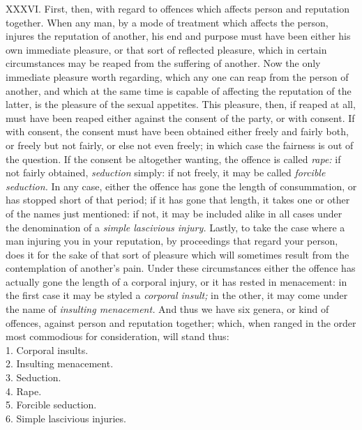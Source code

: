 \documentclass[12pt]{report}
\begin{document}
XXXVI. First, then, with regard to offences which affects person and
reputation together. When any man, by a mode of treatment which affects
the person, injures the reputation of another, his end and purpose must
have been either his own immediate pleasure, or that sort of reflected
pleasure, which in certain circumstances may be reaped from the
suffering of another. Now the only immediate pleasure worth regarding,
which any one can reap from the person of another, and which at the same
time is capable of affecting the reputation of the latter, is the
pleasure of the sexual appetites. This pleasure, then, if reaped at all,
must have been reaped either against the consent of the party, or with
consent. If with consent, the consent must have been obtained either
freely and fairly both, or freely but not fairly, or else not even
freely; in which case the fairness is out of the question. If the
consent be altogether wanting, the offence is called \emph{rape:} if not
fairly obtained, \emph{seduction} simply: if not freely, it may be
called \emph{forcible seduction.} In any case, either the offence has
gone the length of consummation, or has stopped short of that period; if
it has gone that length, it takes one or other of the names just
mentioned: if not, it may be included alike in all cases under the
denomination of a \emph{simple lascivious injury.} Lastly, to take the
case where a man injuring you in your reputation, by proceedings that
regard your person, does it for the sake of that sort of pleasure which
will sometimes result from the contemplation of another's pain. Under
these circumstances either the offence has actually gone the length of a
corporal injury, or it has rested in menacement: in the first case it
may be styled a \emph{corporal insult;} in the other, it may come under
the name of \emph{insulting menacement.} And thus we have six genera, or
kind of offences, against person and reputation together; which, when
ranged in the order most commodious for consideration, will stand
thus:\\
1. Corporal insults.\\
2. Insulting menacement.\\
3. Seduction.\\
4. Rape.\\
5. Forcible seduction.\\
6. Simple lascivious injuries.
\end{document}

